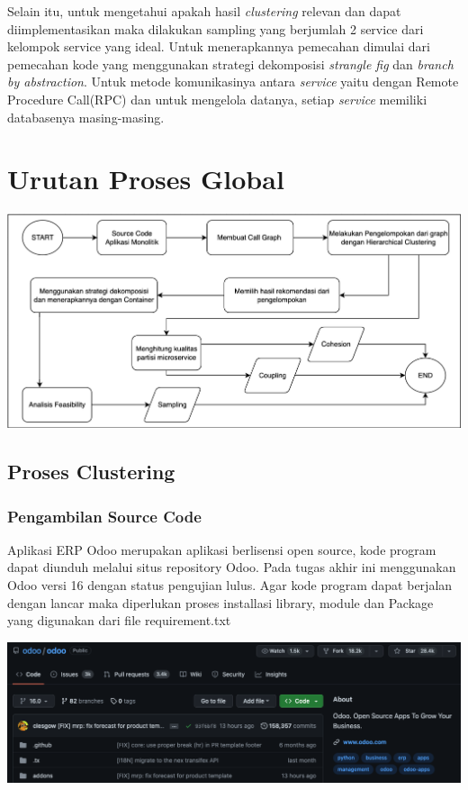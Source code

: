 Selain itu, untuk mengetahui apakah hasil \textit{clustering} relevan dan dapat diimplementasikan maka dilakukan sampling yang berjumlah 2 service dari kelompok service yang ideal. Untuk menerapkannya pemecahan dimulai dari pemecahan kode yang menggunakan strategi dekomposisi \textit{strangle fig } dan \textit{branch by abstraction}. Untuk metode komunikasinya antara \textit{service} yaitu dengan Remote Procedure Call(RPC) dan untuk mengelola datanya, setiap \textit{service} memiliki databasenya masing-masing.\\

\section{Urutan Proses Global}
\begin{center}
	\includegraphics[width=14cm]{img/bab_3/FlowchartProsesGlobal.png}
	\label{fig:proses_Global}
\end{center}

\subsection{Proses Clustering}

\subsubsection{Pengambilan Source Code}
Aplikasi ERP Odoo merupakan aplikasi berlisensi open source, kode program dapat diunduh melalui situs repository Odoo. Pada tugas akhir ini menggunakan Odoo versi 16 dengan status pengujian lulus. Agar kode program dapat berjalan dengan lancar maka diperlukan proses installasi library, module dan Package yang digunakan dari file requirement.txt
\begin{center}
	\includegraphics[width=14cm]{img/bab_3/github.png}
	\label{fig:github_ss}
\end{center}


